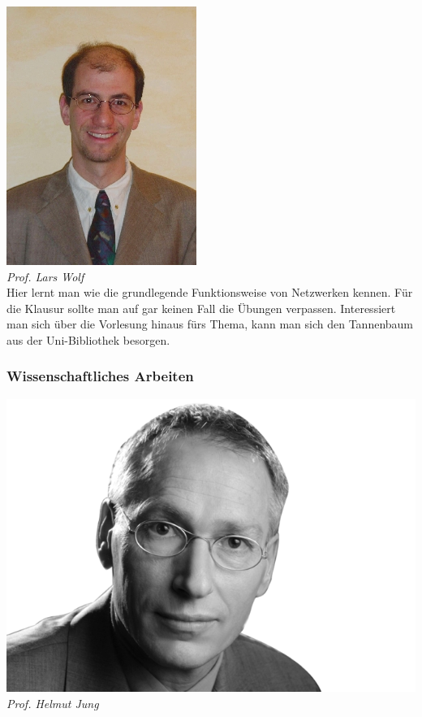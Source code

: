\includegraphics[width=0.8\linewidth]{bilder/dozenten/wolf}\\
\textit{Prof. Lars Wolf}\\
Hier lernt man wie die grundlegende Funktionsweise von Netzwerken
kennen. Für die Klausur sollte man auf gar keinen Fall die Übungen
verpassen. Interessiert man sich über die Vorlesung hinaus fürs Thema,
kann man sich den Tannenbaum aus der Uni-Bibliothek besorgen.

\newpage
\subsubsection{Wissenschaftliches Arbeiten}

\includegraphics[width=0.9\linewidth]{bilder/dozenten/jung_frei.png}\\
\textit{Prof. Helmut Jung}

